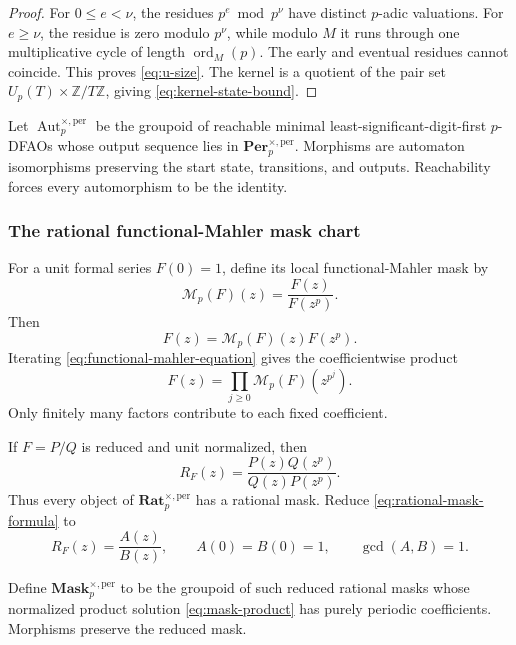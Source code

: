 \documentclass[11pt]{article}
\theoremstyle{definition}
\theoremstyle{remark}
\DeclareMathOperator{\Aut}{Aut}
\newcommand{\Rat}{\mathbf{Rat}}
\newcommand{\Per}{\mathbf{Per}}
\newcommand{\Mask}{\mathbf{Mask}}
\begin{document}
\begin{proof}
For \(0\leq e<\nu\), the residues \(p^e\bmod p^\nu\) have distinct \(p\)-adic valuations.  For \(e\geq\nu\), the residue is zero modulo \(p^\nu\), while modulo \(M\) it runs through one multiplicative cycle of length \(\operatorname{ord}_M(p)\).  The early and eventual residues cannot coincide.  This proves \cref{eq:u-size}.  The kernel is a quotient of the pair set \(U_p(T)\times\mathbb Z/T\mathbb Z\), giving \cref{eq:kernel-state-bound}.
\end{proof}

Let \(\Aut_p^{\times,\mathrm{per}}\) be the groupoid of reachable minimal least-significant-digit-first \(p\)-DFAOs whose output sequence lies in \(\Per_p^{\times,\mathrm{per}}\).  Morphisms are automaton isomorphisms preserving the start state, transitions, and outputs.  Reachability forces every automorphism to be the identity.

\subsubsection{The rational functional-Mahler mask chart}

For a unit formal series \(F(0)=1\), define its local functional-Mahler mask by
\begin{equation}
\label{eq:unique-local-mask}
\mathcal M_p(F)(z)
=
\frac{F(z)}{F(z^p)}.
\end{equation}
Then
\begin{equation}
\label{eq:functional-mahler-equation}
F(z)=\mathcal M_p(F)(z)F(z^p).
\end{equation}
Iterating \cref{eq:functional-mahler-equation} gives the coefficientwise product
\begin{equation}
\label{eq:mask-product}
F(z)
=
\prod_{j\geq0}\mathcal M_p(F)(z^{p^j}).
\end{equation}
Only finitely many factors contribute to each fixed coefficient.

If \(F=P/Q\) is reduced and unit normalized, then
\begin{equation}
\label{eq:rational-mask-formula}
R_F(z)
=
\frac{P(z)Q(z^p)}{Q(z)P(z^p)}.
\end{equation}
Thus every object of \(\Rat_p^{\times,\mathrm{per}}\) has a rational mask.  Reduce \cref{eq:rational-mask-formula} to
\[
R_F(z)=\frac{A(z)}{B(z)},
\qquad
A(0)=B(0)=1,
\qquad
\gcd(A,B)=1.
\]

Define \(\Mask_p^{\times,\mathrm{per}}\) to be the groupoid of such reduced rational masks whose normalized product solution \cref{eq:mask-product} has purely periodic coefficients.  Morphisms preserve the reduced mask.
\end{document}
